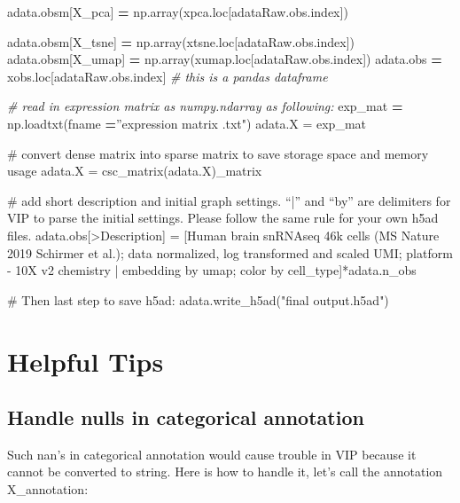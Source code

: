 \documentclass[
]{article}
\newenvironment{Shaded}{\begin{snugshade}}{\end{snugshade}}
\newcommand{\CommentTok}[1]{\textcolor[rgb]{0.56,0.35,0.01}{\textit{#1}}}
\newcommand{\NormalTok}[1]{#1}
\newcommand{\OperatorTok}[1]{\textcolor[rgb]{0.81,0.36,0.00}{\textbf{#1}}}
\newcommand{\StringTok}[1]{\textcolor[rgb]{0.31,0.60,0.02}{#1}}
\begin{document}
\begin{Shaded}
\begin{Highlighting}[]
\NormalTok{adata.obsm[}\StringTok{\textquotesingle{}X\_pca\textquotesingle{}}\NormalTok{] }\OperatorTok{=}\NormalTok{ np.array(xpca.loc[adataRaw.obs.index])}

\NormalTok{adata.obsm[}\StringTok{\textquotesingle{}X\_tsne\textquotesingle{}}\NormalTok{] }\OperatorTok{=}\NormalTok{ np.array(xtsne.loc[adataRaw.obs.index])}
\NormalTok{adata.obsm[}\StringTok{\textquotesingle{}X\_umap\textquotesingle{}}\NormalTok{] }\OperatorTok{=}\NormalTok{ np.array(xumap.loc[adataRaw.obs.index])}
\NormalTok{adata.obs }\OperatorTok{=}\NormalTok{ xobs.loc[adataRaw.obs.index] }\CommentTok{\# this is a pandas dataframe}

\CommentTok{\# read in expression matrix as numpy.ndarray as following:}
\NormalTok{exp\_mat }\OperatorTok{=}\NormalTok{ np.loadtxt(fname }\OperatorTok{=}\NormalTok{”expression matrix .txt}\StringTok{")}
\StringTok{adata.X = exp\_mat}

\StringTok{\# convert dense matrix into sparse matrix to save storage space and memory usage}
\StringTok{adata.X = csc\_matrix(adata.X)\_matrix}

\StringTok{\# add short description and initial graph settings. “|” and “by” are delimiters for VIP to parse the initial settings. Please follow the same rule for your own h5ad files.}
\StringTok{adata.obs[\textquotesingle{}\textgreater{}Description\textquotesingle{}] = [\textquotesingle{}Human brain snRNAseq 46k cells (MS Nature 2019 Schirmer et al.); data normalized, log transformed and scaled UMI; platform {-} 10X v2 chemistry | embedding by umap; color by cell\_type\textquotesingle{}]*adata.n\_obs}

\StringTok{\# Then last step to save h5ad:}
\StringTok{adata.write\_h5ad("}\NormalTok{final output.h5ad}\StringTok{")}
\end{Highlighting}
\end{Shaded}

\hypertarget{helpful-tips}{%
\section{Helpful Tips}\label{helpful-tips}}

\hypertarget{handle-nulls-in-categorical-annotation}{%
\subsection{Handle nulls in categorical annotation}\label{handle-nulls-in-categorical-annotation}}

Such nan's in categorical annotation would cause trouble in VIP because it cannot be converted to string. Here is how to handle it, let's call the annotation X\_annotation:
\end{document}
